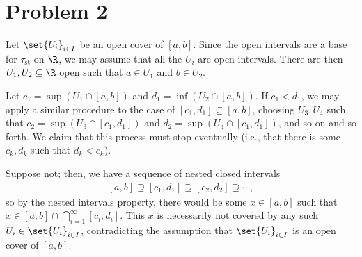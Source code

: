 \documentclass[10pt]{mypackage}
\begin{document}
\RaggedRight
\section{Problem 2}%
Let $\set{U_i}_{i\in I}$ be an open cover of $\left[ a,b \right]$. Since the open intervals are a base for $\tau_{\text{st}}$ on $\R$, we may assume that all the $U_i$ are open intervals. There are then $U_1,U_2\subseteq \R$ open such that $a\in U_1$ and $b\in U_2$.\newline

Let $c_1 = \sup\left( U_1\cap [a,b] \right)$ and $d_1 = \inf\left( U_2\cap [a,b] \right)$. If $c_1 < d_1$, we may apply a similar procedure to the case of $\left[ c_1,d_1 \right]\subseteq \left[ a,b \right]$, choosing $U_3,U_4$ such that $c_2 = \sup\left(  U_3\cap \left[c_1,d_1\right] \right)$ and $d_2 = \sup\left(  U_4\cap \left[ c_1,d_1 \right] \right)$, and so on and so forth. We claim that this process must stop eventually (i.e., that there is some $c_k,d_k$ such that $d_k < c_k$).\newline

Suppose not; then, we have a sequence of nested closed intervals
\begin{align*}
  \left[ a,b \right] \supseteq \left[ c_1,d_1 \right]\supseteq \left[ c_2,d_2 \right]\supseteq \cdots,
\end{align*}
so by the nested intervals property, there would be some $x\in \left[ a,b \right]$ such that $x\in \left[ a,b \right]\cap \bigcap_{i=1}^{\infty}\left[ c_i,d_i \right]$. This $x$ is necessarily not covered by any such $U_i\in \set{U_i}_{i\in I}$, contradicting the assumption that $\set{U_i}_{i\in I}$ is an open cover of $\left[ a,b \right]$.
\end{document}
